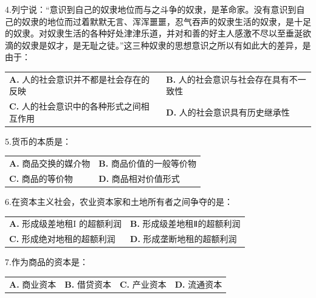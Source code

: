 \documentclass[UTF8,11pt]{ctexart}
\begin{document}
4.列宁说：“意识到自己的奴隶地位而与之斗争的奴隶，是革命家。没有意识到自己的奴隶的地位而过着默默无言、浑浑噩噩，忍气吞声的奴隶生活的奴隶，是十足的奴隶。对奴隶生活的各种好处津津乐道，并对和善的好主人感激不尽以至垂涎欲滴的奴隶是奴才，是无耻之徒。”这三种奴隶的思想意识之所以有如此大的差异，是由于：


\begin{center}\begin{tabular}{>{\raggedright\arraybackslash}p{\dimexpr(\linewidth-4\tabcolsep)/2\relax}>{\raggedright\arraybackslash}p{\dimexpr(\linewidth-4\tabcolsep)/2\relax}}
\textbf{A.} 人的社会意识并不都是社会存在的反映 & \textbf{B.} 人的社会意识与社会存在具有不一致性\\[.35em]
\textbf{C.} 人的社会意识中的各种形式之间相互作用 & \textbf{D.} 人的社会意识具有历史继承性\\[.35em]\end{tabular}\end{center}

5.货币的本质是：


\begin{center}\begin{tabular}{>{\raggedright\arraybackslash}p{\dimexpr(\linewidth-4\tabcolsep)/2\relax}>{\raggedright\arraybackslash}p{\dimexpr(\linewidth-4\tabcolsep)/2\relax}}
\textbf{A.} 商品交换的媒介物 & \textbf{B.} 商品价值的一般等价物\\[.35em]
\textbf{C.} 商品的等价物 & \textbf{D.} 商品相对价值形式\\[.35em]\end{tabular}\end{center}

6.在资本主义社会，农业资本家和土地所有者之间争夺的是：


\begin{center}\begin{tabular}{>{\raggedright\arraybackslash}p{\dimexpr(\linewidth-4\tabcolsep)/2\relax}>{\raggedright\arraybackslash}p{\dimexpr(\linewidth-4\tabcolsep)/2\relax}}
\textbf{A.} 形成级差地租I 的超额利润 & \textbf{B.} 形成级差地租Ⅱ的超额利润\\[.35em]
\textbf{C.} 形成绝对地租的超额利润 & \textbf{D.} 形成垄断地租的超额利润\\[.35em]\end{tabular}\end{center}

7.作为商品的资本是：


\begin{center}\begin{tabular}{>{\raggedright\arraybackslash}p{\dimexpr(\linewidth-8\tabcolsep)/4\relax}>{\raggedright\arraybackslash}p{\dimexpr(\linewidth-8\tabcolsep)/4\relax}>{\raggedright\arraybackslash}p{\dimexpr(\linewidth-8\tabcolsep)/4\relax}>{\raggedright\arraybackslash}p{\dimexpr(\linewidth-8\tabcolsep)/4\relax}}
\textbf{A.} 商业资本 & \textbf{B.} 借贷资本 & \textbf{C.} 产业资本 & \textbf{D.} 流通资本\\[.35em]\end{tabular}\end{center}
\end{document}
